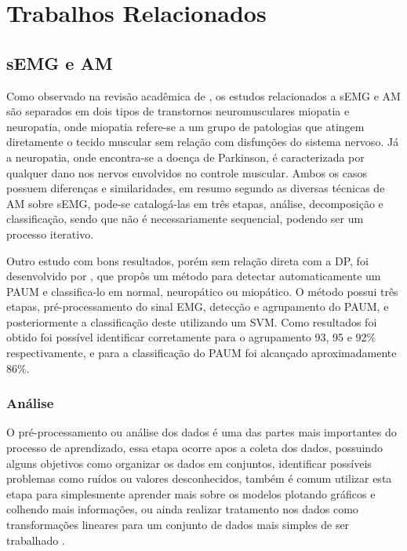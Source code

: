 \chapter[TrabalhosRelacionados]{Trabalhos Relacionados}

\section{sEMG e AM}
Como observado na revisão acadêmica de \cite{yousefi2014characterizing}, os estudos relacionados a sEMG e AM são separados em  dois tipos de transtornos neuromusculares miopatia e neuropatia, onde miopatia refere-se a um grupo de patologias que atingem diretamente o tecido muscular sem relação com disfunções do sistema nervoso. Já a neuropatia, onde encontra-se a doença de Parkinson, é caracterizada por qualquer dano nos nervos envolvidos no controle muscular. Ambos os casos possuem diferenças e similaridades, em resumo segundo \cite{yousefi2014characterizing} as diversas técnicas de AM sobre sEMG, pode-se catalogá-las em três etapas, análise, decomposição e classificação, sendo que não é necessariamente sequencial, podendo ser um processo iterativo.

Outro estudo com bons resultados, porém sem relação direta com a DP, foi desenvolvido por \cite{katsis2006novel}, que propôs um método para detectar automaticamente um PAUM e classifica-lo em normal, neuropático ou miopático. O método possui três etapas, pré-processamento do sinal EMG, detecção e agrupamento do PAUM, e posteriormente a classificação deste utilizando um SVM. Como resultados foi obtido foi possível identificar corretamente para o agrupamento 93, 95 e 92\% respectivamente, e para a classificação do PAUM foi alcançado aproximadamente 86\%. 

\subsection{Análise}
O pré-processamento ou análise dos dados é uma das partes mais importantes do processo de aprendizado, essa etapa ocorre apos a coleta dos dados, possuindo alguns objetivos como organizar os dados em conjuntos, identificar possíveis problemas como ruídos ou valores desconhecidos, também é comum utilizar esta etapa para simplesmente aprender mais sobre os modelos plotando gráficos e colhendo mais informações, ou ainda realizar tratamento nos dados como transformações lineares para um conjunto de dados mais simples de ser trabalhado \cite{batista2003pre}. 

